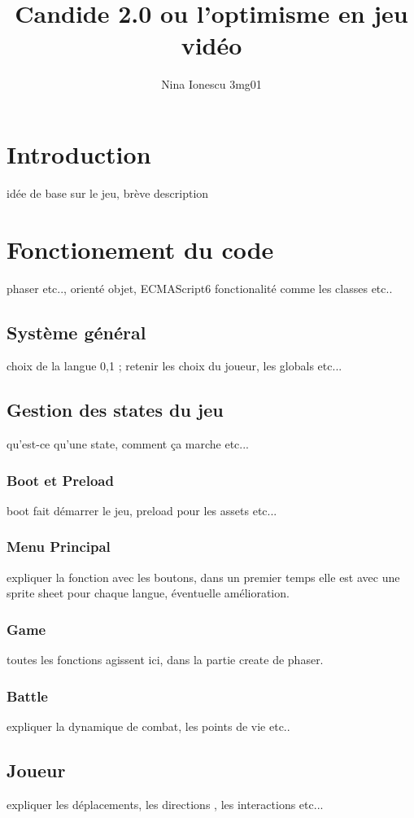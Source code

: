 \documentclass[11pt]{article}
\begin{document}
\title{Candide 2.0 ou l'optimisme en jeu vidéo }
\author{Nina Ionescu 3mg01}
\date{}
\maketitle

\section{Introduction}
idée de base sur le jeu, brève description
\section{Fonctionement du code}
phaser etc.., orienté objet, ECMAScript6  fonctionalité comme les classes etc..
\subsection{Système général}
 choix de la langue 0,1 ; retenir les choix du joueur, les globals etc...
\subsection{Gestion des states du jeu}
qu'est-ce qu'une state, comment ça marche etc...
\subsubsection{Boot et Preload}
boot fait démarrer le jeu, preload pour les assets etc...
\subsubsection{Menu Principal}
expliquer la fonction avec les boutons, dans un premier temps elle est avec une sprite sheet pour chaque langue, éventuelle amélioration.

\subsubsection{Game}
toutes les fonctions agissent ici, dans la partie create de phaser.
\subsubsection{Battle}
expliquer la dynamique de combat, les points de vie etc..
\subsection{Joueur}
expliquer les déplacements, les directions , les interactions etc...
\end{document}
